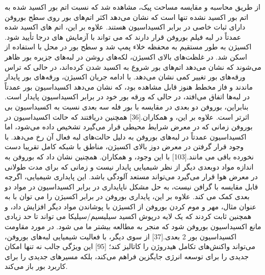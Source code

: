 از طریق محاسبه و مقایسه مساحت پیک، مشاهده شد که نسبت اتم بور اکسید شده به اتم بور اکسید نشده تنها  است که نشان می‌دهد اکثر اتم‌های بور روی سطح بوروفن دارای ثبات خاصی در برابر اکسیداسیون هستند. علاوه بر این، اتم های اکسید شده عمدتاً در لبه فیلم بوروفن قرار دارند که می تواند با آزمایش های  درجا تأیید شود. اکسیژن به طور مستقیم به محفظه خلاء پمپ شد و سطح بور در محل با استفاده از  اسکن شد. در غلظت‌های بالای اکسیژن، لکه‌های روشن در لبه‌های جزیره بور ظاهر می‌شوند که نشان می‌دهد اتم‌های بور شروع به اکسید شدن کرده‌اند، در حالی که تراس ورقه‌های بور تغییر کمی نشان می‌دهد. با ادامه جریان اکسیژن، ورقه‌های بور پایدار ماندند و فاز مخطط هنوز قابل مشاهده بود، که نشان می‌دهد اکسیداسیون بور عمدتاً در لبه‌ها اتفاق می‌افتد، در حالی که ورقه بور خود در برابر اکسیداسیون پایدار است. بنابراین، بوروفن دو بعدی در مقایسه با بور فله سه بعدی نسبت به اکسیداسیون بی اثرتر است. علاوه بر این،  و همکاران.\cite{mannixSynthesisBorophenesAnisotropic2015}[36] همچنین دریافتند که حالت اکسیداسیون در بوروفن زمانی که در معرض شرایط محیطی قرار می‌گیرد تشخیص داده می‌شود، اما اکسیداسیون عمدتاً در لبه‌های بوروفن به دلیل حالت‌های لبه فعال آن رخ می‌دهد. با وجود قرار گرفتن در معرض دوز بالای اکسیژن، مناطق با شبکه کامل تقریبا دست نخورده باقی می مانند.\cite{zhaiObservationAllboronFullerene2014}[103] با این وجود،  و همکاران. همچنین نشان داد که بوروفن به اندازه مواد دوبعدی دیگر از نظر شیمیایی پایدار نیست و زمانی که برای مدت طولانی در معرض هوا قرار می‌گیرد می‌تواند مستعد آلودگی باشد. این پایداری شیمیایی، اگرچه قابل مقایسه با گرافن نیست، به حل مشکل ناپایداری در برابر اکسیداسیون در مواد دو بعدی کمک می کند. علاوه بر این، پایداری بوروفن در برابر اکسیژن را می توان با به عنوان مثال، مهر و موم کردن بوروفن از اکسیژن با پوشاندن مواد دیگر افزایش داد، و همچنین ثابت کردند که یک لایه درپوش اکسید سیلیسیم/سیلیکا می تواند تا حد زیادی مانع اکسیداسیون بوروفن شود که منجر به مطالعه بیشتر ما می شود. در مورد مقاومت اکسیداسیون بور 2 بعدی.\cite{zhangTwodimensionalBoronStructures2017}[37] از سوی دیگر، با فعالیت شیمیایی لبه‌های بوروفن، می‌تواند واکنش‌های تکامل هیدروژن را کاتالیز کند؛ \cite{zhangTwoDimensionalBoronMonolayers2015}[95] این ویژگی جالب نه تنها امکان جدیدی را برای توسعه انرژی جایگزین فراهم می‌کند، بلکه مسیرهای جدیدی را برای کاربرد بور باز می‌کند.

